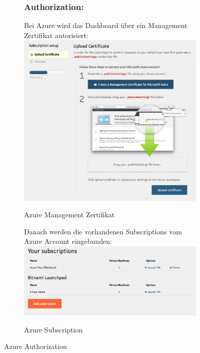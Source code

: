 \begin{figure}[!htbp]
 \begin{subfigure}[b]{.49\textwidth}
\subsubsection{Authorization:}
Bei Azure wird das Dashboard über ein Management Zertifikat autorisiert:
\includegraphics[width=\textwidth]{./03_Analyse/03_Bitnami/images/azure_authorize}
\caption{Azure Management Zertifikat}
\end{subfigure}
\hfill
 \begin{subfigure}[b]{.49\textwidth}
Danach werden die vorhandenen Subscriptions vom Azure Account eingebunden:
\includegraphics[width=\textwidth]{./03_Analyse/03_Bitnami/images/azure_subscriptions}
\caption{Azure Subscription}
\end{subfigure}
\caption{Azure Authorization}
\end{figure}


